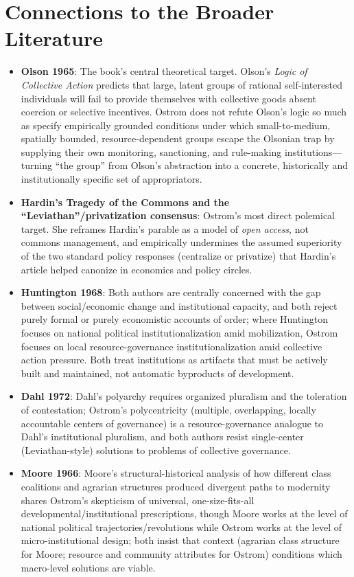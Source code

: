 \documentclass[12pt]{article}
\begin{document}
\section{Connections to the Broader Literature}

\begin{itemize}[leftmargin=*, itemsep=4pt]
    \item \textbf{Olson 1965}: The book's central theoretical target. Olson's \textit{Logic of Collective Action} predicts that large, latent groups of rational self-interested individuals will fail to provide themselves with collective goods absent coercion or selective incentives. Ostrom does not refute Olson's logic so much as specify empirically grounded conditions under which small-to-medium, spatially bounded, resource-dependent groups escape the Olsonian trap by supplying their own monitoring, sanctioning, and rule-making institutions---turning ``the group'' from Olson's abstraction into a concrete, historically and institutionally specific set of appropriators.
    \item \textbf{Hardin's Tragedy of the Commons and the ``Leviathan''/privatization consensus}: Ostrom's most direct polemical target. She reframes Hardin's parable as a model of \emph{open access}, not commons management, and empirically undermines the assumed superiority of the two standard policy responses (centralize or privatize) that Hardin's article helped canonize in economics and policy circles.
    \item \textbf{Huntington 1968}: Both authors are centrally concerned with the gap between social/economic change and institutional capacity, and both reject purely formal or purely economistic accounts of order; where Huntington focuses on national political institutionalization amid mobilization, Ostrom focuses on local resource-governance institutionalization amid collective action pressure. Both treat institutions as artifacts that must be actively built and maintained, not automatic byproducts of development.
    \item \textbf{Dahl 1972}: Dahl's polyarchy requires organized pluralism and the toleration of contestation; Ostrom's polycentricity (multiple, overlapping, locally accountable centers of governance) is a resource-governance analogue to Dahl's institutional pluralism, and both authors resist single-center (Leviathan-style) solutions to problems of collective governance.
    \item \textbf{Moore 1966}: Moore's structural-historical analysis of how different class coalitions and agrarian structures produced divergent paths to modernity shares Ostrom's skepticism of universal, one-size-fits-all developmental/institutional prescriptions, though Moore works at the level of national political trajectories/revolutions while Ostrom works at the level of micro-institutional design; both insist that context (agrarian class structure for Moore; resource and community attributes for Ostrom) conditions which macro-level solutions are viable.

\end{itemize}
\end{document}
